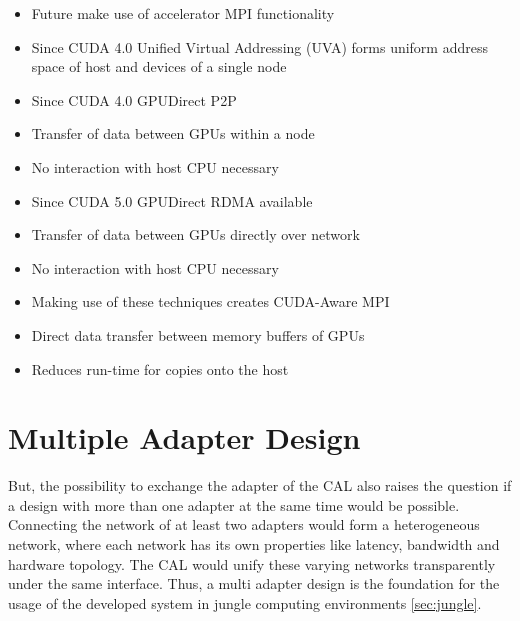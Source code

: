 \begin{itemize}
\item Future make use of accelerator MPI functionality
\item Since CUDA 4.0 Unified Virtual Addressing (UVA) forms
  uniform address space of host and devices of a single node

\item Since CUDA 4.0 GPUDirect P2P
\item Transfer of data between GPUs within a node
\item No interaction with host CPU necessary

\item Since CUDA 5.0 GPUDirect RDMA available
\item Transfer of data between GPUs directly over network
\item No interaction with host CPU necessary

\item Making use of these techniques creates CUDA-Aware MPI
\item Direct data transfer between memory buffers of GPUs
\item Reduces run-time for copies onto the host


\end{itemize}


\section*{Multiple Adapter Design}

But, the possibility to exchange the adapter of the CAL also raises
the question if a design with more than one adapter at the same time
would be possible. Connecting the network of at least two adapters
would form a heterogeneous network, where each network has its own
properties like latency, bandwidth and hardware topology. The CAL
would unify these varying networks transparently under the same
interface. Thus, a multi adapter design is the foundation for the
usage of the developed system in jungle computing environments
\ref{sec:jungle}.



